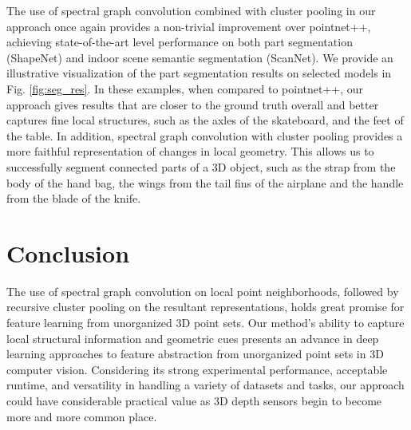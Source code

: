 \documentclass[runningheads]{llncs}
\begin{document}
The use of spectral graph convolution combined with cluster pooling in our approach once again provides a non-trivial improvement over pointnet++, achieving state-of-the-art level performance on both part segmentation (ShapeNet) and indoor scene semantic segmentation (ScanNet). 
We provide an illustrative visualization of the part segmentation results on selected models in Fig. \ref{fig:seg_res}. In these examples, when compared to pointnet++, our approach gives results that are closer to the ground truth overall and better captures fine local structures, such as the axles of the skateboard, and the feet of the table. In addition, spectral graph convolution with cluster pooling provides a more faithful representation of changes in local geometry. This allows us to successfully segment connected parts of a 3D object, such as the strap from the body of the hand bag, the wings from the tail fins of the airplane and the handle from the blade of the knife.


\section{Conclusion}
The use of spectral graph convolution on local point neighborhoods, followed by recursive cluster pooling on the resultant representations, holds great promise for feature learning from unorganized 3D point sets. Our method's ability to capture local structural information and geometric cues presents an advance in deep learning approaches to feature abstraction from unorganized point sets in 3D computer vision. Considering its strong experimental performance, acceptable runtime, and versatility in handling a variety of datasets and tasks, our approach could have considerable practical value as 3D depth sensors begin to become more and more common place.

\clearpage



\end{document}
